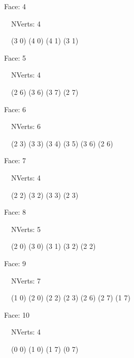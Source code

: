 \documentclass{article}
\begin{document}
    {\footnotesize

    Face: 4

    \   \    NVerts: 4

     \   \   (3 0) (4 0) (4 1) (3 1)}

    {\footnotesize

    Face: 5

    \   \    NVerts: 4

     \   \   (2 6) (3 6) (3 7) (2 7)}

    {\footnotesize

    Face: 6

    \   \    NVerts: 6

     \   \   (2 3) (3 3) (3 4) (3 5) (3 6) (2 6)}

    {\footnotesize

    Face: 7

    \   \    NVerts: 4

     \   \   (2 2) (3 2) (3 3) (2 3)}

    {\footnotesize

    Face: 8

    \   \    NVerts: 5

     \   \   (2 0) (3 0) (3 1) (3 2) (2 2)}

    {\footnotesize

    Face: 9

    \   \    NVerts: 7

     \   \   (1 0) (2 0) (2 2) (2 3) (2 6) (2 7) (1 7)}

    {\footnotesize

    Face: 10

    \   \    NVerts: 4

     \   \   (0 0) (1 0) (1 7) (0 7)}


     \newpage
\end{document}
